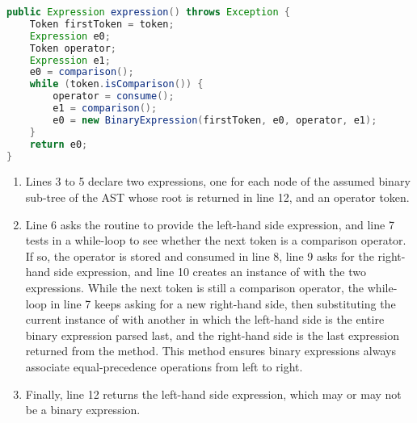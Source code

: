 \begin{lstlisting}[language=Java,caption={Parsing Expressions.},label={alg:expr}]
public Expression expression() throws Exception {
	Token firstToken = token;
	Expression e0;
	Token operator;
	Expression e1;
	e0 = comparison();
	while (token.isComparison()) {
		operator = consume();
		e1 = comparison();
		e0 = new BinaryExpression(firstToken, e0, operator, e1);
	}
	return e0;
}
\end{lstlisting}

\begin{enumerate}
	\addtocounter{enumi}{2}
	\item Lines 3 to 5 declare two expressions, one for each node of the assumed binary sub-tree of the AST whose root is returned in line 12, and an operator token.
	\addtocounter{enumi}{2}
	\item Line 6 asks the  routine to provide the left-hand side expression, and line 7 tests in a while-loop to see whether the next token is a comparison operator. If so, the operator is stored and consumed in line 8, line 9 asks  for the right-hand side expression, and line 10 creates an instance of  with the two expressions. While the next token is still a comparison operator, the while-loop in line 7 keeps asking  for a new right-hand side, then substituting the current instance of  with another in which the left-hand side is the entire binary expression parsed last, and the right-hand side is the last expression returned from the  method. This method ensures binary expressions always associate equal-precedence operations from left to right.
	\addtocounter{enumi}{5}
	\item Finally, line 12 returns the left-hand side expression, which may or may not be a binary expression.
\end{enumerate}

